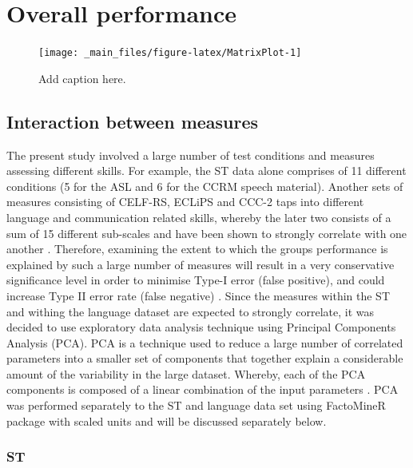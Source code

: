 \documentclass[a4paper, twoside]{templates/ociamthesis}
\begin{document}
\hypertarget{overall-performance}{%
\section{Overall performance}\label{overall-performance}}

\begin{figure}

{\centering \texttt{[image: \_main\_files/figure-latex/MatrixPlot-1]} 

}

\caption{Add caption here.}\label{fig:MatrixPlot}
\end{figure}

\hypertarget{interaction-between-measures}{%
\subsection{Interaction between measures}\label{interaction-between-measures}}

The present study involved a large number of test conditions and measures assessing different skills. For example, the ST data alone comprises of 11 different conditions (5 for the ASL and 6 for the CCRM speech material). Another sets of measures consisting of CELF-RS, ECLiPS and CCC-2 taps into different language and communication related skills, whereby the later two consists of a sum of 15 different sub-scales and have been shown to strongly correlate with one another \autocite{Barry2014}. Therefore, examining the extent to which the groups performance is explained by such a large number of measures will result in a very conservative significance level in order to minimise Type-I error (false positive), and could increase Type II error rate (false negative) \autocite{McDonald2014}. Since the measures within the ST and withing the language dataset are expected to strongly correlate, it was decided to use exploratory data analysis technique using Principal Components Analysis (PCA). PCA is a technique used to reduce a large number of correlated parameters into a smaller set of components that together explain a considerable amount of the variability in the large dataset. Whereby, each of the PCA components is composed of a linear combination of the input parameters \autocite{JamesGareth2013}. PCA was performed separately to the ST and language data set using FactoMineR package \autocite{Le2008} with scaled units and will be discussed separately below.

\hypertarget{st-1}{%
\subsubsection{ST}\label{st-1}}
\end{document}
